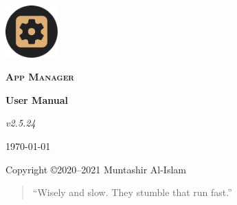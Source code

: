 \begin{titlingpage}
    \pagecolor{SunTan}
    \begin{center}
        \includegraphics[width=2cm]{images/icon}\par\vspace{1cm}
        {\Huge\textbf{\textsc{App Manager}}\par}
        \vspace{2.5cm}
        {\huge\bfseries User Manual\par}
        \vspace{.5cm}
        {\Large\itshape v2.5.24\par}
        \vfill
        {\large \today\par}
        \vfill
        {Copyright \copyright 2020--2021 Muntashir Al-Islam\par}
        \pagebreak
        \pagecolor{white}
        \begin{quotation}
            ``Wisely and slow. They stumble that run fast.''
        \end{quotation}
    \end{center}
\end{titlingpage}
